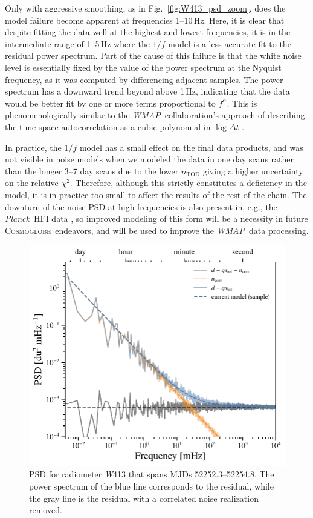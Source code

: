 \documentclass[twocolumn]{../../common/aa}
\def\WMAP{\emph{WMAP}}
\def\Planck{\emph{Planck}}
\newcommand{\cosmoglobe}{\textsc{Cosmoglobe}}
\newcommand{\W}[0]{\textit W}
\begin{document}
Only with aggressive smoothing, as in Fig.~\ref{fig:W413_psd_zoom}, does the
model failure become apparent at frequencies 1--10\,Hz.  Here, it is clear that
despite fitting the data well at the highest and lowest frequencies, it is in
the intermediate range of 1--5\,Hz where the $1/f$ model is a less accurate
fit to the residual power spectrum. Part of the cause of this failure is that the white
noise level is essentially fixed by the value of the power spectrum at the
Nyquist frequency, as it was computed by differencing adjacent samples. The
power spectrum has a downward trend beyond above 1\,Hz, indicating that the
data would be better fit by one or more terms proportional to $f^\alpha$. This
is phenomenologically similar to the \WMAP\ collaboration's approach of
describing the time-space autocorrelation as a cubic polynomial in $\log\Delta t$ \citep{jarosik2007}.  


In practice, the $1/f$ model has a small effect on the final data products, and
was not visible in noise models when we modeled the data in one day scans
rather than the longer 3--7 day scans due to the lower $n_\mathrm{TOD}$ giving
a higher uncertainty on the relative $\chi^2$.  Therefore, although this
strictly constitutes a deficiency in the model, it is in practice too small to
affect the results of the rest of the chain. The downturn of the noise PSD at
high frequencies is also present in, e.g., the \Planck\ HFI data
\citep[Fig.~1]{planck2014-a10}, so improved modeling of this form will be a
necessity in future \cosmoglobe\ endeavors, and will be used to improve the
\WMAP\ data processing.

\begin{figure}
	\includegraphics[width=\columnwidth]{figures/ps_test_W4_det1.pdf}
	\caption{PSD for radiometer \W413 that spans MJDs 52252.3--52254.8. The power spectrum of the blue line corresponds to the residual, while the gray line is the residual with a correlated noise realization removed.}
	\label{fig:W413_psd}
\end{figure}
\end{document}

